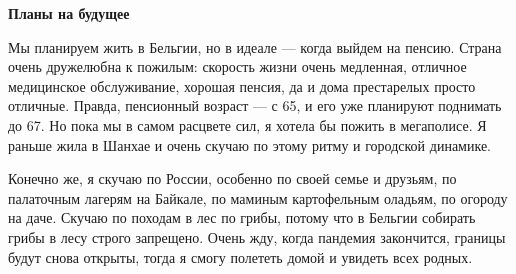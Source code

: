 \textbf{Планы на будущее}

Мы планируем жить в Бельгии, но в идеале — когда выйдем на пенсию. Страна очень дружелюбна к пожилым: скорость жизни очень медленная, отличное медицинское обслуживание, хорошая пенсия, да и дома престарелых просто отличные. Правда, пенсионный возраст — с 65, и его уже планируют поднимать до 67. Но пока мы в самом расцвете сил, я хотела бы пожить в мегаполисе. Я раньше жила в Шанхае и очень скучаю по этому ритму и городской динамике.

Конечно же, я скучаю по России, особенно по своей семье и друзьям, по палаточным лагерям на Байкале, по маминым картофельным оладьям, по огороду на даче. Скучаю по походам в лес по грибы, потому что в Бельгии собирать грибы в лесу строго запрещено. Очень жду, когда пандемия закончится, границы будут снова открыты, тогда я смогу полететь домой и увидеть всех родных.